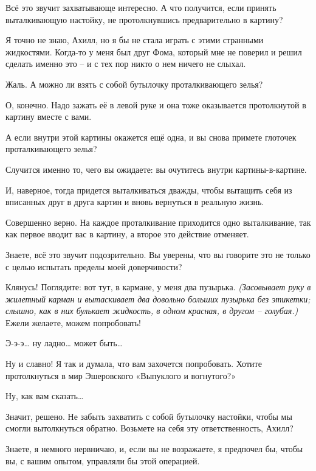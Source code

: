 \documentclass[../main.tex]{subfiles}
\begin{document}
\begin{Dialogue}
\begin{sublevel}
 Всё это звучит захватывающе интересно. А что получится, если принять выталкивающую настойку, не протолкнувшись предварительно в картину?

 Я точно не знаю, Ахилл, но я бы не стала играть с этими странными жидкостями. Когда-то у меня был друг Фома, который мне не поверил и решил сделать именно это \--- и с тех пор никто о нем ничего не слыхал.

 Жаль. А можно ли взять с собой бутылочку проталкивающего зелья?

 О, конечно. Надо зажать её в левой руке и она тоже оказывается протолкнутой в картину вместе с вами.

 А если внутри этой картины окажется ещё одна, и вы снова примете глоточек проталкивающего зелья?

 Случится именно то, чего вы ожидаете: вы очутитесь внутри картины-в-картине.

 И, наверное, тогда придется выталкиваться дважды, чтобы вытащить себя из вписанных друг в друга картин и вновь вернуться в реальную жизнь.

 Совершенно верно. На каждое проталкивание приходится одно выталкивание, так как первое вводит вас в картину, а второе это действие отменяет.

 Знаете, всё это звучит подозрительно. Вы уверены, что вы говорите это не только с целью испытать пределы моей доверчивости?

 Клянусь! Поглядите: вот тут, в кармане, у меня два пузырька. \emph{(Засовывает руку в жилетный карман и вытаскивает два довольно больших пузырька без этикетки; слышно, как в них булькает жидкость, в одном красная, в другом \--- голубая.)} Ежели желаете, можем попробовать!

 Э-э-э\ldots{} ну ладно\ldots{} может быть\ldots{}

 Ну и славно! Я так и думала, что вам захочется попробовать. Хотите протолкнуться в мир Эшеровского «Выпуклого и вогнутого?»

 Ну, как вам сказать\ldots{}

 Значит, решено. Не забыть захватить с собой бутылочку настойки, чтобы мы смогли вытолкнуться обратно. Возьмете на себя эту ответственность, Ахилл?

 Знаете, я немного нервничаю, и, если вы не возражаете, я предпочел бы, чтобы вы, с вашим опытом, управляли бы этой операцией.


\end{sublevel}
\end{Dialogue}
\end{document}
